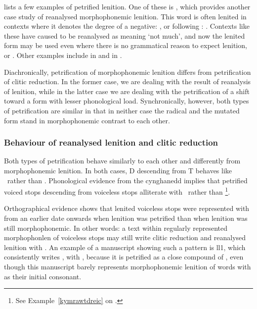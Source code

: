 \Textcite[448-451]{morgan_y_1952} lists a few examples of petrified lenition. One of these is , which provides another case study of reanalysed morphophonemic lenition. This word is often lenited in contexts where it denotes the degree of a negative: \eg {}, or following \oes: . Contexts like these have caused  to be reanalysed as meaning `not much', and now the lenited form may be used even where there is no grammatical reason to expect lenition, \eg {} or . Other examples include  in  and  in .

Diachronically, petrification of morphophonemic lenition differs from petrification of clitic reduction. 
In the former case, we are dealing with the result of reanalysis of lenition, while in the latter case we are dealing with the petrification of a shift toward a form with lesser phonological load. 
Synchronically, however, both types of petrification are similar in that in neither case the radical and the mutated form stand in morphophonemic contrast to each other. 

\subsubsection{Behaviour of reanalysed lenition and clitic reduction}
\label{sec:their-behaviour}
Both types of petrification behave similarly to each other and differently from morphophonemic lenition. 
In both cases, \gls{D} descending from \gls{T} behaves like \xD\ rather than \lT. Phonological evidence from the cynghanedd implies that petrified voiced stops descending from voiceless stops alliterate with \xD\ rather than \lT\footnote{See Example~\ref{kymrawtdreic} on .}.

Orthographical evidence shows that lenited voiceless stops were represented with  from an earlier date onwards when lenition was petrified than when lenition was still morphophonemic. 
In other words: a text within regularly represented \gls{morphophonlen} of voiceless stops may still write clitic reduction and reanalysed lenition with . 
An example of a manuscript showing such a pattern is \gls{ll1}, which consistently writes , with , because it is petrified as a close compound of , even though this manuscript barely represents morphophonemic lenition of words with  as their initial consonant.

